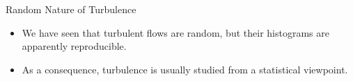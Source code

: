 
\begin{frame}{Random Nature of Turbulence}
  \begin{itemize}
  	\item We have seen that turbulent flows are random, but their histograms are apparently reproducible.
  	\item As a consequence, turbulence is usually studied from a statistical viewpoint.
  \end{itemize}
\end{frame}



